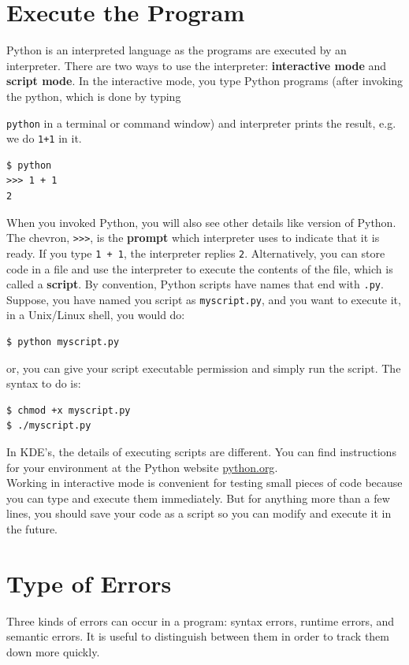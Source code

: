 \documentclass[10pt]{book}
\begin{document}
\section{Execute the Program}
Python is an interpreted language as the programs are executed by an interpreter. 
There are two ways to use the interpreter: 
{\bf interactive mode} and {\bf script mode}. 
In the interactive mode, you type Python programs (after invoking the python, 
which is done by typing {\verb"python" in a terminal or command window) and 
interpreter prints the result, e.g. we do \verb"1+1" in it.

\beforeverb
\begin{verbatim}
$ python
>>> 1 + 1
2
\end{verbatim}
\afterverb
When you invoked Python, you will also see other details like version of Python. \\ 

The chevron, \verb">>>", is the {\bf prompt} which interpreter uses to indicate 
that it is ready. If you type {\tt 1 + 1}, the interpreter replies {\tt 2}. 
Alternatively, you can store code in a file and use the interpreter to execute 
the contents of the file, which is called a {\bf script}.  By convention, Python 
scripts have names that end with {\tt .py}. Suppose, you have named you script as 
{\tt myscript.py}, and you want to execute it, in a Unix/Linux shell, you would do:
\beforeverb
\begin{verbatim}
$ python myscript.py
\end{verbatim}
\afterverb
or, you can give your script executable permission and simply run the script. 
The syntax to do is:
\beforeverb
\begin{verbatim}
$ chmod +x myscript.py
$ ./myscript.py
\end{verbatim}
\afterverb

In KDE's, the details of executing scripts are different.  
You can find instructions for your environment at the Python website \url{python.org}. \\


Working in interactive mode is convenient for testing small pieces of code because 
you can type and execute them immediately.  But for anything more than a few lines, 
you should save your code as a script so you can modify and execute it in the future. \\


\section{Type of Errors}
Three kinds of errors can occur in a program: syntax errors, runtime  errors, and 
semantic errors. It is useful to distinguish between them in order to track them down 
more quickly. \\

}
\end{document}
